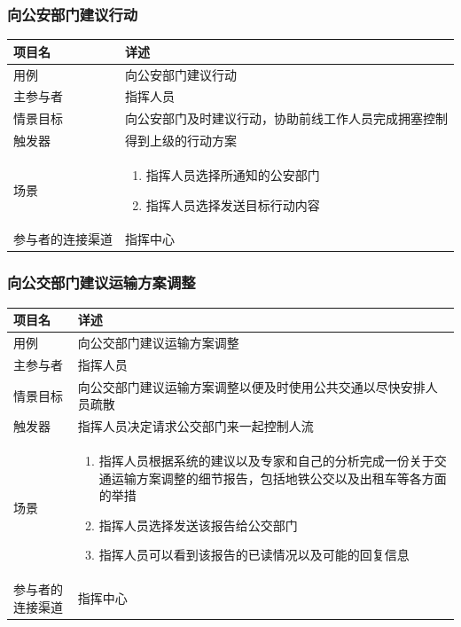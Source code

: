 \documentclass{ctexrep}
\begin{document}
\subsubsection{向公安部门建议行动}
\begin{longtable}{p{2cm} | p{10cm}}
\hline
项目名 & 详述 \\
\hline
\hline
用例 & 向公安部门建议行动\\
\hline
主参与者 & 指挥人员 \\
\hline
情景目标 &  向公安部门及时建议行动，协助前线工作人员完成拥塞控制\\
\hline
触发器 &  得到上级的行动方案\\
\hline
场景 & \begin{enumerate}
	\item 指挥人员选择所通知的公安部门
	\item 指挥人员选择发送目标行动内容
\end{enumerate} \\
\hline
参与者的连接渠道 & 指挥中心 \\
\hline
\end{longtable}
\subsubsection{向公交部门建议运输方案调整}
\begin{longtable}{p{2cm} | p{10cm}}
\hline
项目名 & 详述 \\
\hline
\hline
用例 & 向公交部门建议运输方案调整\\
\hline
主参与者 & 指挥人员 \\
\hline
情景目标 & 向公交部门建议运输方案调整以便及时使用公共交通以尽快安排人员疏散 \\
\hline
触发器 & 指挥人员决定请求公交部门来一起控制人流 \\
\hline
场景 & \begin{enumerate}
	\item 指挥人员根据系统的建议以及专家和自己的分析完成一份关于交通运输方案调整的细节报告，包括地铁公交以及出租车等各方面的举措
	\item 指挥人员选择发送该报告给公交部门
	\item 指挥人员可以看到该报告的已读情况以及可能的回复信息
\end{enumerate} \\
\hline
参与者的连接渠道 & 指挥中心\\
\hline
\end{longtable}
\end{document}
